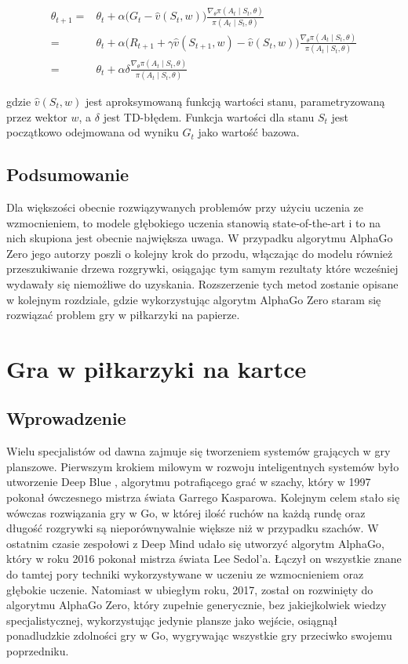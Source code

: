 \documentclass[licencjacka]{pracamgr}
\begin{document}
\begin{align*}
\theta_{t+1} =& \theta_t + \alpha \Big( G_t - \hat{v}(S_t, w) \Big) \frac{\nabla_\theta \pi(A_t \mid S_t, \theta)}{\pi(A_t \mid S_t, \theta)} \\
=& \theta_t + \alpha \Big( R_{t+1} + \gamma \hat{v}(S_{t+1}, w) - \hat{v}(S_t, w) \Big) \frac{\nabla_\theta \pi(A_t \mid S_t, \theta)}{\pi(A_t \mid S_t, \theta)} \\
=& \theta_t + \alpha \delta \frac{\nabla_\theta \pi(A_t \mid S_t, \theta)}{\pi(A_t \mid S_t, \theta)}
\end{align*}

gdzie $ \hat{v}(S_t, w) $ jest aproksymowaną funkcją wartości stanu, parametryzowaną przez wektor $w$, a $\delta$ jest TD-błędem. Funkcja wartości dla stanu $S_t$ jest początkowo odejmowana od wyniku $G_t$ jako wartość bazowa. 

\section{Podsumowanie}

Dla większości obecnie rozwiązywanych problemów przy użyciu uczenia ze wzmocnieniem, to modele głębokiego uczenia stanowią state-of-the-art i to na nich skupiona jest obecnie największa uwaga. W przypadku algorytmu AlphaGo Zero jego autorzy poszli o kolejny krok do przodu, włączając do modelu również przeszukiwanie drzewa rozgrywki, osiągając tym samym rezultaty które wcześniej wydawały się niemożliwe do uzyskania. Rozszerzenie tych metod zostanie opisane w kolejnym rozdziale, gdzie wykorzystując algorytm AlphaGo Zero staram się rozwiązać problem gry w piłkarzyki na papierze.

\chapter{Gra w piłkarzyki na kartce}

\section{Wprowadzenie}

Wielu specjalistów od dawna zajmuje się tworzeniem systemów grających w gry planszowe. Pierwszym krokiem milowym w rozwoju inteligentnych systemów było utworzenie Deep Blue \cite{deep-blue}, algorytmu potrafiącego grać w szachy, który w 1997 pokonał ówczesnego mistrza świata Garrego Kasparowa. Kolejnym celem stało się wówczas rozwiązania gry w Go, w której ilość ruchów na każdą rundę oraz długość rozgrywki są nieporównywalnie większe niż w przypadku szachów. W ostatnim czasie zespołowi z Deep Mind udało się utworzyć algorytm AlphaGo\cite{alphago2016}, który w roku 2016 pokonał mistrza świata Lee Sedol'a. Łączył on wszystkie znane do tamtej pory techniki wykorzystywane w uczeniu ze wzmocnieniem oraz głębokie uczenie. Natomiast w ubiegłym roku, 2017, został on rozwinięty do algorytmu AlphaGo Zero\cite{alphagozero}, który zupełnie generycznie, bez jakiejkolwiek wiedzy specjalistycznej, wykorzystując jedynie plansze jako wejście, osiągnął ponadludzkie zdolności gry w Go, wygrywając wszystkie gry przeciwko swojemu poprzedniku. 
\end{document}
